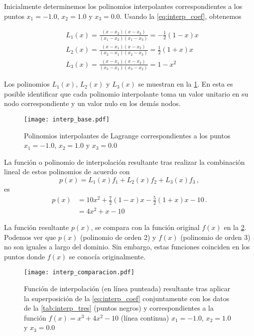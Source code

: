 Inicialmente determinemos los polinomios interpolantes correspondientes a 
los puntos $x_1 = -1.0$, $x_2 =  1.0$ y $x_3 = 0.0$. Usando la 
\cref{eq:interp_coef}, obtenemos

\begin{align*}
& L_1(x) = \frac{(x - x_2)(x - x_3)}{(x_1 - x_2)(x_1 - x_3)} = -\frac{1}{2}(1 
- x)x\\
& L_2(x) = \frac{(x - x_1)(x - x_3)}{(x_2 - x_1)(x_2 - x_3)} = \frac{1}{2}(1 
+ x)x\\
& L_3(x) = \frac{(x - x_1)(x - x_2)}{(x_3 - x_1)(x_3 - x_2)} = 1 - x^2
\end{align*}

Los polinomios $L_1(x)$, $L_2(x)$ y $L_3(x)$ se muestran en la 
\cref{fig:interp_base}. En esta es posible identificar que cada polinomio 
interpolante toma un valor unitario en su nodo correspondiente y un valor nulo 
en los demás nodos.
\begin{figure}[H]
  \centering
  \texttt{[image: interp\_base.pdf]}
  \caption{Polinomios interpolantes de Lagrange correspondientes a los puntos $x_1 =  -1.0$, $x_2 = 1.0$ y $x_3 = 0.0$}
  \label{fig:interp_base}
\end{figure}

La función o polinomio de interpolación resultante tras realizar la combinación lineal de estos polinomios de acuerdo con
\[p(x) = L_1(x) f_1 + L_2(x) f_2 + L_3(x) f_3\, ,\]
es
\begin{align*}
p(x) &= 10 x^2 + \frac{7}{2}(1 - x)x - \frac{5}{2}(1 + x)x - 10\, .\\
     &= 4x^2 + x - 10
\end{align*}

La función resultante $p(x)$, se compara con la función original $f(x)$ en la \cref{fig:interp_comparacion}. Podemos ver que $p(x)$ (polinomio de orden 2) y $f(x)$ (polinomio de orden 3) no son iguales a largo del dominio. Sin embargo, estas funciones coinciden en los puntos donde $f(x)$ se conocía originalmente.

\begin{figure}[H]
  \centering
  \texttt{[image: interp\_comparacion.pdf]}
  \caption{Función de interpolación (en línea punteada) resultante tras aplicar 
  la superposición de la \cref{eq:interp_coef} conjuntamente con los datos de 
  la \cref{tab:interp_tres} (puntos negros) y correspondientes a la función 
  $f(x) = {x^3} + 4{x^2} - 10$ (línea continua) ${x_1} =  - 1.0$, ${x_2} =  
  1.0$ y ${x_3} = 0.0$}
  \label{fig:interp_comparacion}
\end{figure}

